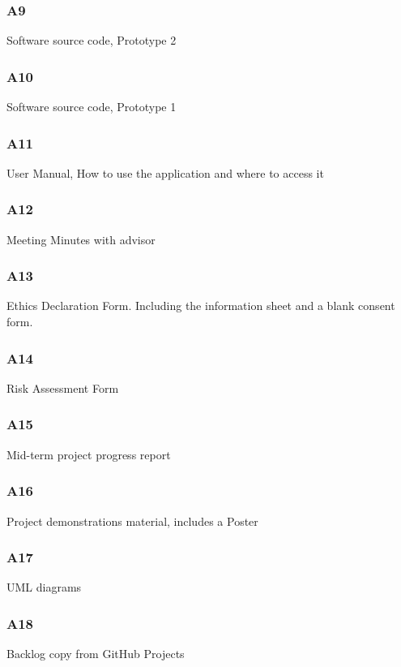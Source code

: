 \subsubsection{A9} \label{A9}
Software source code, Prototype 2

\subsubsection{A10} \label{A10}
Software source code, Prototype 1

\subsubsection{A11} \label{A11}
User Manual, How to use the application and where to access it

\subsubsection{A12} \label{A12}
Meeting Minutes with advisor

\subsubsection{A13} \label{A13}
Ethics Declaration Form. Including the information sheet and a blank consent form.

\subsubsection{A14} \label{A14}
Risk Assessment Form

\subsubsection{A15} \label{A15}
Mid-term project progress report

\subsubsection{A16} \label{A16}
Project demonstrations material, includes a Poster

\subsubsection{A17} \label{A17}
UML diagrams

\subsubsection{A18} \label{A18}
Backlog copy from GitHub Projects